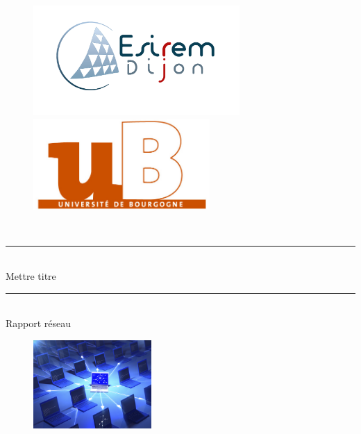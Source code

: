 \documentclass[11pt]{article}
\begin{document}
\begin{titlepage}
	\newcommand{\HRule}{\rule{\linewidth}{0.2mm}}     
            
	\begin{figure}[t]
		\begin{minipage}{0.5\textwidth}\large
			\begin{flushleft}
				\includegraphics[width=0.7\textwidth]{assets/logoEsirem.jpg}
			\end{flushleft}
		\end{minipage}
		\begin{minipage}{0.5\textwidth}\large
			\begin{flushright}
			\includegraphics[width=0.6\textwidth]{assets/logoUb.jpg}
			\end{flushright}
		\end{minipage}
	\end{figure}
	\textsc{ \\[1cm]}
     
     
	\begin{center}
	\HRule \\
	{\Large   
		Mettre titre
	}
	\HRule
	\\[0.5cm]
	{\large Rapport réseau \\}
   \end{center}

	\begin{figure}[h]
		\begin{center}
			\includegraphics[width=0.4\textwidth]{assets/main.jpg}
		\end{center}
	\end{figure}
        

\end{titlepage}
\end{document}

